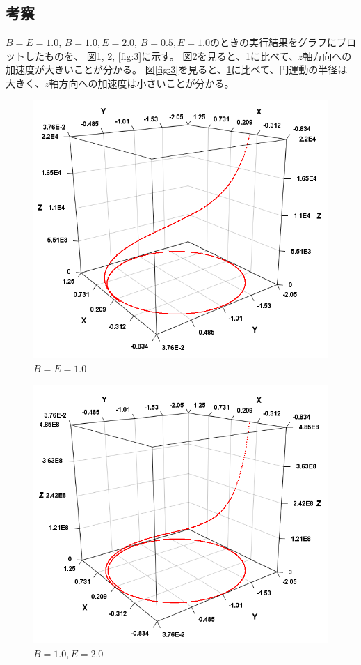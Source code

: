\documentclass[a4j,titlepage]{jsarticle}
\begin{document}
\subsection{考察}
$B=E=1.0$, $B=1.0, E=2.0$, $B=0.5, E=1.0$のときの実行結果をグラフにプロットしたものを、
図\ref{fig:1}, \ref{fig:2}, \ref{fig:3}に示す。
図\ref{fig:2}を見ると、\ref{fig:1}に比べて、$z$軸方向への加速度が大きいことが分かる。
図\ref{fig:3}を見ると、\ref{fig:1}に比べて、円運動の半径は大きく、$z$軸方向への加速度は小さいことが分かる。


\begin{figure}[H]
  \centering
  \includegraphics[width=12cm]{1.png}
  \caption{$B=E=1.0$}
  \label{fig:1}
\end{figure}

\begin{figure}[H]
  \centering
  \includegraphics[width=12cm]{2.png}
  \caption{$B=1.0, E=2.0$}
  \label{fig:2}
\end{figure}
\end{document}
